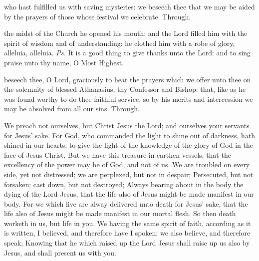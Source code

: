 \postcommunion
{} who hast fulfilled us with saving mysteries: we beseech thee that we may be aided by the prayers of those whose festival we celebrate. Through.


\vspace{-0.4\baselineskip}


\vspace{-0.5\baselineskip}

\introit

\vspace{-0.25\baselineskip}

 the midst of the Church he opened his mouth: and the Lord filled him with the spirit of wisdom and of understanding: he clothed him with a robe of glory, alleluia, alleluia. \textit{Ps.} It is a good thing to give thanks unto the Lord: and to sing praise unto thy name, O Most Highest.

\vspace{-0.35\baselineskip}

\collect

\vspace{-0.3\baselineskip}

 beseech thee, O Lord, graciously to hear the prayers which we offer unto thee on the solemnity of blessed Athanasius, thy Confessor and Bishop: that, like as he was found worthy to do thee faithful service, so by his merits and intercession we may be absolved from all our sins. Through.

\vspace{-0.35\baselineskip}


\vspace{-0.3\baselineskip}

 We preach not ourselves, but Christ Jesus the Lord; and ourselves your servants for Jesus' sake. For God, who commanded the light to shine out of darkness, hath shined in our hearts, to give the light of the knowledge of the glory of God in the face of Jesus Christ. But we have this treasure in earthen vessels, that the excellency of the power may be of God, and not of us. We are troubled on every side, yet not distressed; we are perplexed, but not in despair; Persecuted, but not forsaken; cast down, but not destroyed; Always bearing about in the body the dying of the Lord Jesus, that the life also of Jesus might be made manifest in our body. For we which live are alway delivered unto death for Jesus' sake, that the life also of Jesus might be made manifest in our mortal flesh. So then death worketh in us, but life in you. We having the same spirit of faith, according as it is written, I believed, and therefore have I spoken; we also believe, and therefore speak; Knowing that he which raised up the Lord Jesus shall raise up us also by Jesus, and shall present us with you.

